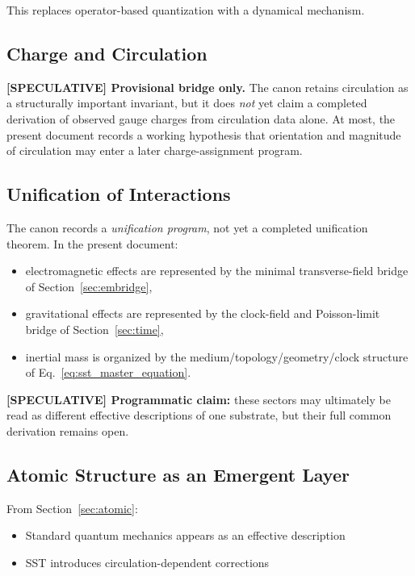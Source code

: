 \documentclass[11pt]{article}
\theoremstyle{definition}
\theoremstyle{plain}
\theoremstyle{remark}
\begin{document}
        This replaces operator-based quantization with a dynamical mechanism.
    
    \subsection{Charge and Circulation}
        
        \textbf{[SPECULATIVE] Provisional bridge only.} The canon retains circulation as a structurally important invariant, but it does \emph{not} yet claim a completed derivation of observed gauge charges from circulation data alone. At most, the present document records a working hypothesis that orientation and magnitude of circulation may enter a later charge-assignment program.
    
    \subsection{Unification of Interactions}
        
        The canon records a \emph{unification program}, not yet a completed unification theorem. In the present document:
        \begin{itemize}
            \item electromagnetic effects are represented by the minimal transverse-field bridge of Section~\ref{sec:embridge},
            \item gravitational effects are represented by the clock-field and Poisson-limit bridge of Section~\ref{sec:time},
            \item inertial mass is organized by the medium/topology/geometry/clock structure of Eq.~\eqref{eq:sst_master_equation}.
        \end{itemize}
        
        \textbf{[SPECULATIVE] Programmatic claim:} these sectors may ultimately be read as different effective descriptions of one substrate, but their full common derivation remains open.
    
    \subsection{Atomic Structure as an Emergent Layer}
        
        From Section~\ref{sec:atomic}:
        
        \begin{itemize}
            \item Standard quantum mechanics appears as an effective description
            \item SST introduces circulation-dependent corrections
        \end{itemize}
        
\end{document}
